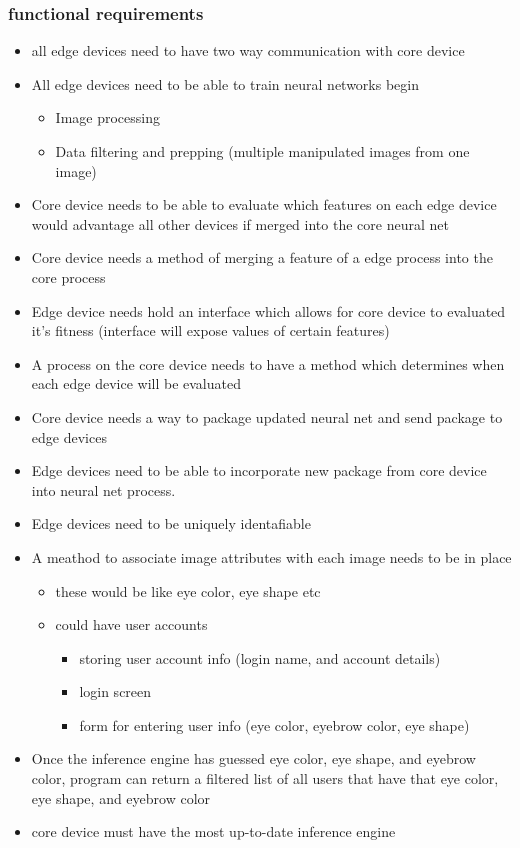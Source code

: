 \documentclass[onecolumn, draftclsnofoot,10pt, compsoc]{IEEEtran}
\begin{document}
	\subsubsection{functional requirements}
	\begin{itemize}
		\item all edge devices need to have two way communication with core device
		\item All edge devices need to be able to train neural networks
		begin\begin{itemize}
			\item Image processing
			\item Data filtering and prepping (multiple manipulated images from one image)
		\end{itemize}
		\item Core device needs to be able to evaluate which features on each edge device would advantage all other devices if merged into the core neural net
		\item Core device needs a method of merging a feature of a edge process into the core process
		\item Edge device needs hold an interface which allows for core device to evaluated it's fitness (interface will expose values of certain features)
		\item A process on the core device needs to have a method which determines when each edge device will be evaluated
		\item Core device needs a way to package updated neural net and send package to edge devices
		\item Edge devices need to be able to incorporate new package from core device into neural net process.		
		\item Edge devices need to be uniquely identafiable
		\item A meathod to associate image attributes with each image needs to be in place
		\begin{itemize}
			\item these would be like eye color, eye shape etc
			\item could have user accounts
			\begin{itemize}
				\item storing user account info (login name, and account details)
				\item login screen
				\item form for entering user info (eye color, eyebrow color, eye shape)
			\end{itemize}
		\end{itemize}
		\item Once the inference engine has guessed eye color, eye shape, and eyebrow color, program can return a filtered list of all users that have that eye color, eye shape, and eyebrow color
		\item core device must have the most up-to-date inference engine
	\end{itemize}
\end{document}
